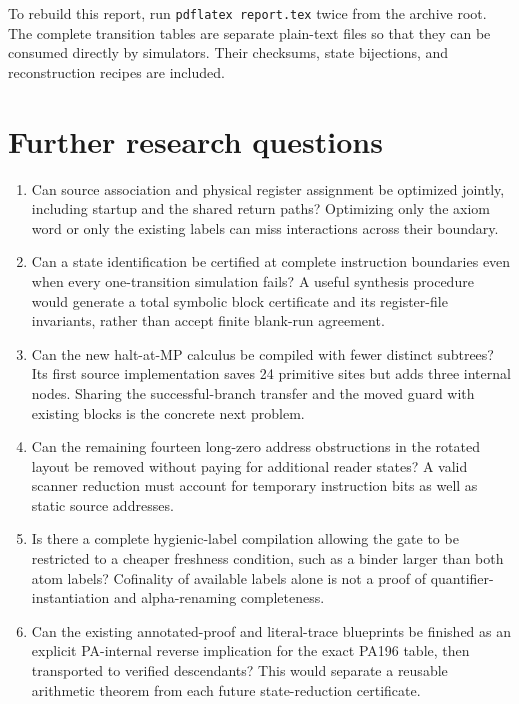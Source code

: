 \documentclass[11pt,letterpaper]{article}
\begin{document}
To rebuild this report, run \texttt{pdflatex report.tex} twice from the
archive root. The complete transition tables are separate plain-text
files so that they can be consumed directly by simulators. Their
checksums, state bijections, and reconstruction recipes are included.

\section{Further research questions}

\begin{enumerate}
\item Can source association and physical register assignment be
optimized jointly, including startup and the shared return paths?
Optimizing only the axiom word or only the existing labels can miss
interactions across their boundary.
\item Can a state identification be certified at complete instruction
boundaries even when every one-transition simulation fails? A useful
synthesis procedure would generate a total symbolic block certificate
and its register-file invariants, rather than accept finite blank-run
agreement.
\item Can the new halt-at-MP calculus be compiled with fewer distinct
subtrees? Its first source implementation saves 24 primitive sites but
adds three internal nodes. Sharing the successful-branch transfer and
the moved guard with existing blocks is the concrete next problem.
\item Can the remaining fourteen long-zero address obstructions in the
rotated layout be removed without paying for additional reader states?
A valid scanner reduction must account for temporary instruction bits
as well as static source addresses.
\item Is there a complete hygienic-label compilation allowing the gate
to be restricted to a cheaper freshness condition, such as a binder
larger than both atom labels? Cofinality of available labels alone is
not a proof of quantifier-instantiation and alpha-renaming completeness.
\item Can the existing annotated-proof and literal-trace blueprints be
finished as an explicit PA-internal reverse implication for the exact
PA196 table, then transported to verified descendants? This would
separate a reusable arithmetic theorem from each future state-reduction
certificate.
\end{enumerate}
\end{document}
